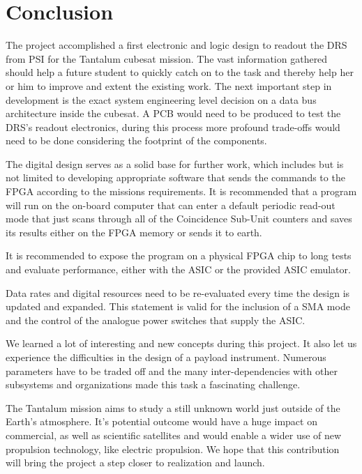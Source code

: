 \section{Conclusion}
\label{sec:conclusion}
The project accomplished a first electronic and logic design to readout the DRS from PSI for the Tantalum cubesat mission.
The vast information gathered should help a future student to quickly catch on to the task and thereby help her or him to improve and extent the existing work.
The next important step in development is the exact system engineering level decision on a data bus architecture inside the cubesat.
A PCB would need to be produced to test the DRS's readout electronics, during this process more profound trade-offs would need to be done considering the footprint of the components.
\newline 

The digital design serves as a solid base for further work, which includes but is not limited to developing appropriate software that sends the commands to the FPGA according to the missions requirements. It is recommended that a program will run on the on-board computer that can enter a default periodic read-out mode that just scans through all of the Coincidence Sub-Unit counters and saves its results either on the FPGA memory or sends it to earth.

It is recommended to expose the program on a physical FPGA chip to long tests and evaluate performance, either with the ASIC or the provided ASIC emulator. 

Data rates and digital resources need to be re-evaluated every time the design is updated and expanded. This statement is valid for the inclusion of a SMA mode and the control of the analogue power switches that supply the ASIC.
\newline


We learned a lot of interesting and new concepts during this project.
It also let us experience the difficulties in the design of a payload instrument.
Numerous parameters have to be traded off and the many inter-dependencies with other subsystems and organizations made this task a fascinating challenge.
\newline

The Tantalum mission aims to study a still unknown world just outside of the Earth's atmosphere.
It's potential outcome would have a huge impact on commercial, as well as scientific satellites and would enable a wider use of new propulsion technology, like electric propulsion.
We hope that this contribution will bring the project a step closer to realization and launch.

